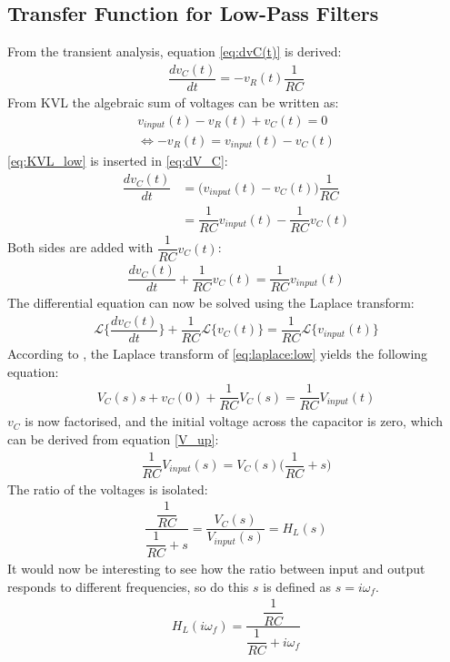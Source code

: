 \subsection{Transfer Function for Low-Pass Filters}
From the transient analysis, equation \eqref{eq:dvC(t)} is derived:
\begin{align} \label{eq:dV_C}
\dfrac{dv_C(t)}{dt}=-v_R(t)\dfrac{1}{RC}
\end{align}
From KVL the algebraic sum of voltages can be written as: 
\begin{align}
v_{input}(t)-v_{R}(t)+v_{C}(t)=0
\\
\Leftrightarrow -v_{R}(t) = v_{input}(t) - v_{C}(t) \label{eq:KVL_low}
\end{align}
\eqref{eq:KVL_low} is inserted in \eqref{eq:dV_C}:
\begin{align} 
\dfrac{dv_C(t)}{dt}&=\Big(v_{input}(t) - v_{C}(t)\Big)\dfrac{1}{RC}
\\
&=\dfrac{1}{RC}v_{input}(t) - \dfrac{1}{RC}v_{C}(t)
\end{align}
Both sides are added with $\dfrac{1}{RC}v_C(t)$:
\begin{align}
\dfrac{dv_C(t)}{dt}+\dfrac{1}{RC}v_C(t)=\dfrac{1}{RC}v_{input}(t)
\end{align}
The differential equation can now be solved using the Laplace transform:
\begin{align}\label{eq:laplace:low}\mathcal{L}\bigg\{\dfrac{dv_C(t)}{dt}\bigg\}+\dfrac{1}{RC}\mathcal{L}\Big\{v_C(t)\Big\}=\dfrac{1}{RC}\mathcal{L}\Big\{v_{input}(t)\Big\}
\end{align}
According to , the Laplace transform of \eqref{eq:laplace:low} yields the following equation:
\begin{align}
V_C(s)s+v_C(0)+\dfrac{1}{RC}V_C(s)=\dfrac{1}{RC}V_{input}(t)
\end{align} 
$v_{C}$ is now factorised, and the initial voltage across the capacitor is zero, which can be derived from equation \eqref{V_up}:
\begin{align}
\dfrac{1}{RC}V_{input}(s)=V_{C}(s)\Big(\dfrac{1}{RC}+s\Big)
\end{align} 
The ratio of the voltages is isolated:
\begin{align}
\dfrac{\dfrac{1}{RC}}{\dfrac{1}{RC}+s} = \dfrac{V_{C}(s)}{V_{input}(s)}=H_L(s)
\end{align}
It would now be interesting to see how the ratio between input and output responds to different frequencies, so do this $s$ is defined as $s=i\omega_f$.
\begin{align} \label{eq:trans_low}
H_{L}(i \omega_f) = \dfrac{\dfrac{1}{RC}}{\dfrac{1}{RC}+i \omega_f} 
\end{align}
